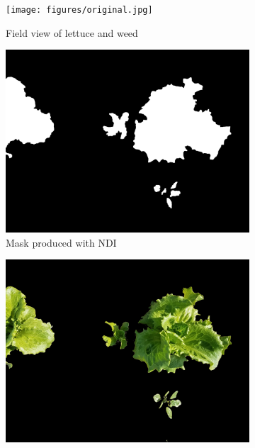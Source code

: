 \documentclass[letterpaper]{report}
\begin{document}
{\begin{figure}[H]
	\centering
	\begin{subfigure}[h]{.30\textwidth}
	  \centering
	  \texttt{[image: figures/original.jpg]}
	  \caption{Field view of lettuce and weed}
	  \label{fig:original}
	\end{subfigure}
	\begin{subfigure}[h]{.30\textwidth}
	  \centering
	  \includegraphics[width=1\linewidth]{figures/original-mask.jpg}
	  \caption{Mask produced with NDI}
	  \label{fig:mask}
	\end{subfigure}
	\begin{subfigure}[h]{.30\textwidth}
	  \centering
	  \includegraphics[width=1\linewidth]{figures/original-masked.jpg}

\end{subfigure}
\end{figure}}
\end{document}
